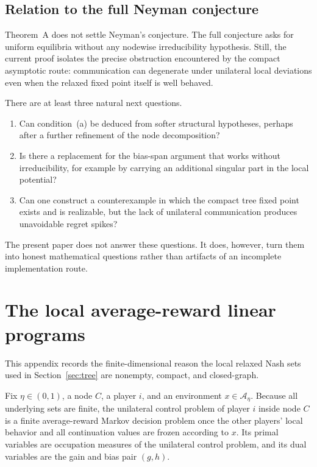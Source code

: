 \documentclass[12pt]{article}
\theoremstyle{definition}
\newcommand{\1}{\mathbf{1}}
\newcommand{\cA}{\mathcal{A}}
\begin{document}
\subsection{Relation to the full Neyman conjecture}

Theorem~A does not settle Neyman's conjecture.  The full conjecture asks for uniform
equilibria without any nodewise irreducibility hypothesis.  Still, the current proof
isolates the precise obstruction encountered by the compact asymptotic route:
communication can degenerate under unilateral local deviations even when the relaxed fixed
point itself is well behaved.

There are at least three natural next questions.

\begin{enumerate}[label=\textnormal{(\arabic*)},leftmargin=2.4em]
\item Can condition~(a) be deduced from softer structural hypotheses, perhaps after a
further refinement of the node decomposition?
\item Is there a replacement for the bias-span argument that works without irreducibility,
for example by carrying an additional singular part in the local potential?
\item Can one construct a counterexample in which the compact tree fixed point exists and
is realizable, but the lack of unilateral communication produces unavoidable regret spikes?
\end{enumerate}

The present paper does not answer these questions.  It does, however, turn them into
honest mathematical questions rather than artifacts of an incomplete implementation route.

\appendix

\section{The local average-reward linear programs}
\label{app:local-LP}

This appendix records the finite-dimensional reason the local relaxed Nash sets used in
Section~\ref{sec:tree} are nonempty, compact, and closed-graph.

Fix \(\eta\in(0,1)\), a node \(C\), a player \(i\), and an environment \(x\in \cA_\eta\).
Because all underlying sets are finite, the unilateral control problem of player \(i\)
inside node \(C\) is a finite average-reward Markov decision problem once the other
players' local behavior and all continuation values are frozen according to \(x\).  Its
primal variables are occupation measures of the unilateral control problem, and its dual
variables are the gain and bias pair \((g,h)\).
\end{document}
